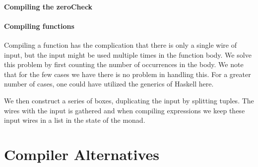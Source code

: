 \paragraph{Compiling the zeroCheck}
\label{sec:compiling-zerochk}


\paragraph{Compiling functions}
\label{sec:compiling-functions}

Compiling a function has the complication that there is only a single
wire of input, but the input might be used multiple times in the
function body. We solve this problem by first counting the number of
occurrences in the body. We note that for the few cases we have there
is no problem in handling this. For a greater number of cases, one could
have utilized the generics of Haskell here.

We then construct a series of boxes, duplicating the input by
splitting tuples. The wires with the input is gathered and when
compiling expressions we keep these input wires in a list in the state
of the monad.


\section{Compiler Alternatives}


